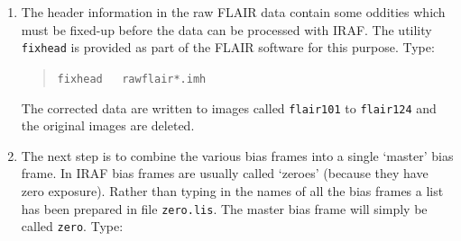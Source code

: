 \documentclass[twoside,11pt]{article}
\begin{document}
\begin{enumerate}
  \begin{quote}
   {\tt imhead ~ rawflair*.imh ~ > ~ heads.txt}
  \end{quote}

   Here task {\tt imhead} extracts the header information and the IRAF {\tt
   cl} Unix-like output redirection mechanism is used to write it to file
   {\tt heads.txt}.  The contents of this file should be:

\begin{quote}
\begin{verbatim}
rawflair0001.imh[420,578][short]: Bias
rawflair0002.imh[420,578][short]: Hg-Cd
rawflair0003.imh[420,578][short]: F454-1
rawflair0004.imh[420,578][short]: F454-2
rawflair0005.imh[420,578][short]: F454-3
rawflair0006.imh[420,578][short]: F454-4
rawflair0007.imh[420,578][short]: F454-5
rawflair0008.imh[420,578][short]: Rb
rawflair0009.imh[420,578][short]: Rb
rawflair0010.imh[420,578][short]: Hg-Cd
rawflair0011.imh[420,578][short]: Hg-Cd
rawflair0012.imh[420,578][short]: Dome flat
rawflair0013.imh[420,578][short]: Dome flat
rawflair0014.imh[420,578][short]: Dome flat
rawflair0015.imh[420,578][short]: Bias
rawflair0016.imh[420,578][short]: Bias
rawflair0017.imh[420,578][short]: Bias
rawflair0018.imh[420,578][short]: Bias
rawflair0019.imh[420,578][short]: Bias
rawflair0020.imh[420,578][short]: Bias
rawflair0021.imh[420,578][short]: Bias
rawflair0022.imh[420,578][short]: Bias
rawflair0023.imh[420,578][short]: Bias
rawflair0024.imh[420,578][short]: Bias
\end{verbatim}
\end{quote}

   A copy of the output is also provided in file {\tt
   flairheads.txt} for comparison.  It is obvious from this
   output which file contains which sort of observation.

  \item The header information in the raw FLAIR data contain some oddities
   which must be fixed-up before the data can be processed with IRAF.  The
   utility {\tt fixhead} is provided as part of the FLAIR software for
   this purpose.  Type:

  \begin{quote}
   {\tt fixhead ~ rawflair*.imh}
  \end{quote}

   The corrected data are written to images called {\tt flair101}
   to {\tt flair124} and the original images are deleted.

  \item The next step is to combine the various bias frames into
   a single `master' bias frame.  In IRAF bias frames are usually
   called `zeroes' (because they have zero exposure).  Rather
   than typing in the names of all the bias frames a list has
   been prepared in file {\tt zero.lis}.  The master bias frame
   will simply be called {\tt zero}.  Type:


\end{enumerate}
\end{document}
